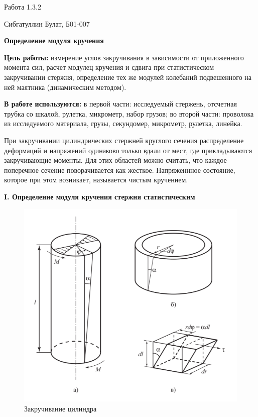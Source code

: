 \documentclass[12pt,a4paper]{article}
\begin{document}
\begin{center}
    \large
    Работа 1.3.2
    
    Сибгатуллин Булат, Б01-007
    
    \vspace{0.5cm}
    \textbf{Определение модуля кручения}

\end{center}

\vspace{0.5cm}
\textbf{Цель работы:} измерение углов закручивания в зависимости от приложенного момента сил, расчет модулец кручения и сдвига при статистическом закручивании стержня, определение тех же модулей колебаний подвешенного на ней маятника (динамическим методом).

\vspace{0.5cm}
\textbf{В работе используются:} в первой части: исследуемый стержень, отсчетная трубка со шкалой, рулетка, микрометр, набор грузов; во второй части: проволока из исследуемого материала, грузы, секундомер, микрометр, рулетка, линейка.

\vspace{0.5cm}

При закручивании цилиндрических стержней круглого сечения распределение деформаций и напряжений одинаково только вдали от мест, где прикладываются закручивающие моменты. Для этих областей можно считать, что каждое поперечное сечение поворачивается как жесткое. Напряженнное состояние, которое при этом возникает, называется чистым кручением.

\begin{center}
    \large
    \textbf{I. Определение модуля кручения стержня статистическим}
\end{center}

\begin{figure}[h!]
\centering
\includegraphics[scale=0.8]{Image1.png}
\caption{Закручивание цилиндра}
\label{fig:Image1}
\end{figure}
\end{document}
